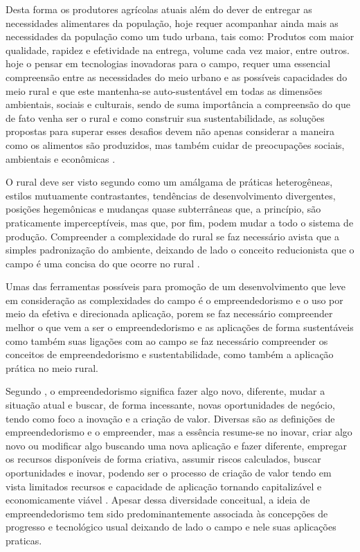 Desta forma os produtores agrícolas atuais além do dever de entregar as necessidades alimentares da população, hoje requer acompanhar ainda mais as necessidades da população como um tudo urbana, tais como: Produtos com maior qualidade, rapidez e efetividade na entrega, volume cada vez maior, entre outros. hoje o pensar em tecnologias inovadoras para o campo, requer uma essencial compreensão entre as necessidades do meio urbano e as possíveis capacidades do meio rural e que este mantenha-se auto-sustentável em todas as dimensões ambientais, sociais e culturais, sendo de suma importância a compreensão do que de fato venha ser o rural e como construir sua sustentabilidade, as soluções propostas para superar esses desafios devem não apenas considerar a maneira como os alimentos são produzidos, mas também cuidar de preocupações sociais, ambientais e econômicas \cite{noauthor_achieving_2020}. 

O rural deve ser visto segundo \cite{kageyama_desenvolvimento_2008} como um amálgama de práticas heterogêneas, estilos mutuamente contrastantes, tendências de desenvolvimento divergentes, posições hegemônicas e mudanças quase subterrâneas que, a princípio, são praticamente imperceptíveis, mas que, por fim, podem mudar a todo o sistema de produção. Compreender a complexidade do rural se faz necessário avista que a simples padronização do ambiente, deixando de lado o conceito reducionista que o campo é uma concisa do que ocorre no rural \cite{van_der_ploeg_trajetorias_2011}. 

Umas das ferramentas possíveis para promoção de um desenvolvimento que leve em consideração as complexidades do campo é o empreendedorismo e o uso por meio da efetiva e direcionada aplicação, porem se faz necessário compreender melhor o que vem a ser o empreendedorismo e as aplicações de forma sustentáveis como também suas ligações com ao campo se faz necessário compreender os conceitos de empreendedorismo e sustentabilidade, como também a aplicação prática no meio rural. 

Segundo , o empreendedorismo significa fazer algo novo, diferente, mudar a situação atual e buscar, de forma incessante, novas oportunidades de negócio, tendo como foco a inovação e a criação de valor. Diversas são as definições de empreendedorismo e o empreender, mas a essência resume-se no inovar, criar algo novo ou modificar algo buscando uma nova aplicação e fazer diferente, empregar os recursos disponíveis de forma criativa, assumir riscos calculados, buscar oportunidades e inovar, podendo ser o processo de criação de valor tendo em vista limitados recursos e capacidade de aplicação tornando capitalizável e economicamente viável \cite{costa_empreendedorismo_2006, stevenson_new_1989, lopes_educacao_2010}. Apesar dessa diversidade conceitual, a ideia de empreendedorismo tem sido predominantemente associada às concepções de progresso e tecnológico usual deixando de lado o campo e nele suas aplicações praticas.  

